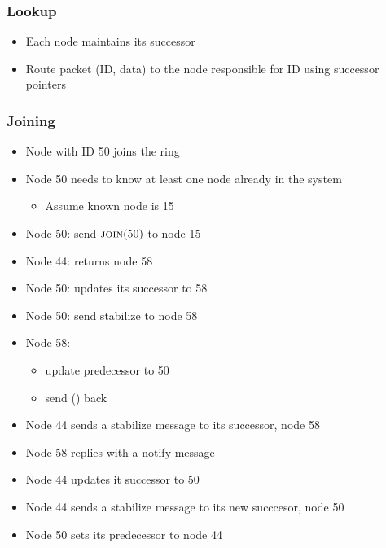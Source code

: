 \subsubsection{Lookup}
\begin{itemize}[nosep]
    \item Each node maintains its successor
    \item Route packet (ID, data) to the node responsible for ID using successor pointers
\end{itemize}

\subsubsection{Joining}
\begin{itemize}[nosep]
    \item Node with ID 50 joins the ring
    \item Node 50 needs to know at least one node already in the system
          \begin{itemize}[nosep]
              \item Assume known node is 15
          \end{itemize}
    \item Node 50: send $\textproc{join}(50)$ to node 15
    \item Node 44: returns node 58
    \item Node 50: updates its successor to 58
    \item Node 50: send stabilize to node 58
    \item Node 58:
          \begin{itemize}[nosep]
              \item update predecessor to 50
              \item send () back
          \end{itemize}
    \item Node 44 sends a stabilize message to its successor, node 58
    \item Node 58 replies with a notify message
    \item Node 44 updates it successor to 50
    \item Node 44 sends a stabilize message to its new succcesor, node 50
    \item Node 50 sets its predecessor to node 44
\end{itemize}


